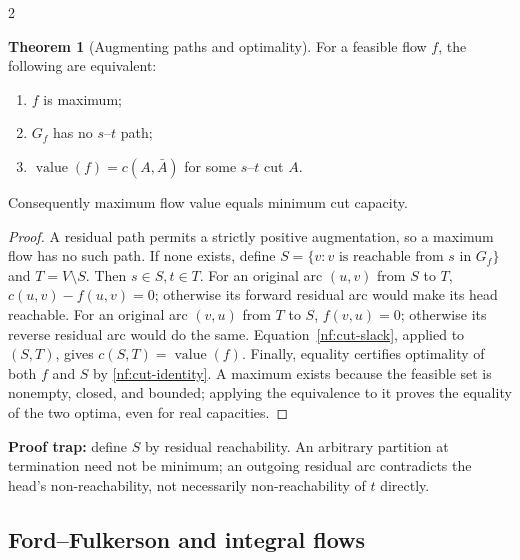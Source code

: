 \documentclass[8pt]{extarticle}
\theoremstyle{definition}
\newtheorem{theorem}[definition]{Theorem}
\begin{document}
\begin{multicols*}{2}
\begin{theorem}[Augmenting paths and optimality]\label{nf:mfmc}
For a feasible flow $f$, the following are equivalent:
\begin{enumerate}
 \item $f$ is maximum;
 \item $G_f$ has no $s$--$t$ path;
 \item $\operatorname{value}(f)=c(A,\bar A)$ for some $s$--$t$ cut $A$.
\end{enumerate}
Consequently maximum flow value equals minimum cut capacity.
\end{theorem}
\begin{proof}
A residual path permits a strictly positive augmentation, so a maximum flow
has no such path. If none exists, define
$S=\{v:v\text{ is reachable from }s\text{ in }G_f\}$ and $T=V\setminus S$.
Then $s\in S,t\in T$. For an original arc $(u,v)$ from $S$ to $T$,
$c(u,v)-f(u,v)=0$;
otherwise its forward residual arc would make its head reachable.
For an original arc $(v,u)$ from $T$ to $S$, $f(v,u)=0$;
otherwise its reverse residual arc would do the same.
Equation~\eqref{nf:cut-slack}, applied to $(S,T)$, gives
$c(S,T)=\operatorname{value}(f)$.
Finally, equality certifies optimality of both $f$ and $S$ by
\eqref{nf:cut-identity}. A maximum exists because the feasible set is nonempty,
closed, and bounded; applying the equivalence to it proves the equality of
the two optima, even for real capacities.
\end{proof}
\textbf{Proof trap:} define $S$ by residual reachability. An arbitrary partition
at termination need not be minimum; an outgoing residual arc contradicts the
head's non-reachability, not necessarily non-reachability of $t$ directly.

\subsection{Ford--Fulkerson and integral flows}\label{nf:ff}


\end{multicols*}
\end{document}
